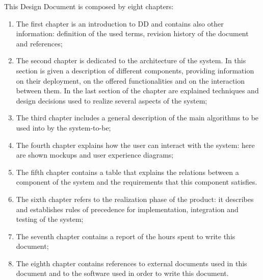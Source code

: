 This Design Document is composed by eight chapters:
\begin{enumerate}
\item The first chapter is an introduction to DD and contains also other information: definition of the used terms, revision history of the document and references;
\item The second chapter is dedicated to the architecture of the system. In this section is given a description of different components, providing information on their deployment, on the offered functionalities and on the interaction between them. In the last section of the chapter are explained techniques and design decisions used to realize several aspects of the system;
\item The third chapter includes a general description of the main algorithms to be used into by the system-to-be;
\item The fourth chapter explains how the user can interact with the system: here are shown mockups and user experience diagrams;
\item The fifth chapter contains a table that explains the relations between a component of the system and the requirements that this component satisfies.
\item The sixth chapter refers to the realization phase of the product: it describes and establishes rules of precedence for implementation, integration and testing of the system;
\item The seventh chapter contains a report of the hours spent to write this document;
\item The eighth chapter contains references to external documents used in this document and to the software used in order to write this document.
\end{enumerate}
